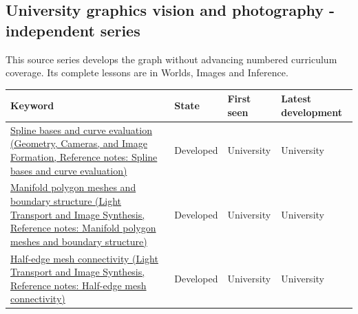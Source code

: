 \subsection{University graphics vision and photography - independent series}\label{appendix-a6d556a4ef50-university-graphics-vision-and-photography---independent-series}

This source series develops the graph without advancing numbered curriculum coverage. Its complete lessons are in {Worlds, Images and Inference}.

{\def\LTcaptype{none} %
\begin{longtable}[]{@{}
  >{\raggedright\arraybackslash}p{}
  >{\raggedright\arraybackslash}p{}
  >{\raggedright\arraybackslash}p{}
  >{\raggedright\arraybackslash}p{}@{}}
\toprule\noalign{}
\begin{minipage}[b]{\linewidth}\raggedright
Keyword
\end{minipage} & \begin{minipage}[b]{\linewidth}\raggedright
State
\end{minipage} & \begin{minipage}[b]{\linewidth}\raggedright
First seen
\end{minipage} & \begin{minipage}[b]{\linewidth}\raggedright
Latest development
\end{minipage} \\
\midrule\noalign{}
\endhead
\bottomrule\noalign{}
\endlastfoot
\href{../03-Geometry-Cameras-and-Image-Formation/main.pdf\#nameddest=appendix-f28eeec97a3d}{Spline bases and curve evaluation (Geometry, Cameras, and Image Formation, Reference notes: Spline bases and curve evaluation)} & Developed & University & University \\
\href{../04-Light-Transport-and-Image-Synthesis/main.pdf\#nameddest=appendix-fab348609369}{Manifold polygon meshes and boundary structure (Light Transport and Image Synthesis, Reference notes: Manifold polygon meshes and boundary structure)} & Developed & University & University \\
\href{../04-Light-Transport-and-Image-Synthesis/main.pdf\#nameddest=appendix-1aea26b2307f}{Half-edge mesh connectivity (Light Transport and Image Synthesis, Reference notes: Half-edge mesh connectivity)} & Developed & University & University \\

\end{longtable}}
